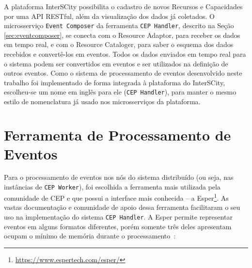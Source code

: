 A plataforma InterSCity possibilita o cadastro de novos Recursos e Capacidades por uma API RESTful, além da visualização dos dados já coletados. O microsserviço \texttt{Event Composer} da ferramenta \texttt{CEP Handler}, descrito na Seção \ref{sec:eventcomposer}, se conecta com o Resource Adaptor, para receber os dados em tempo real, e com o Resource Cataloger, para saber o esquema dos dados recebidos e convertê-los em eventos. Todos os dados enviados em tempo real para o sistema podem ser convertidos em eventos e ser utilizados na definição de outros eventos.
Como o sistema de processamento de eventos desenvolvido neste trabalho foi implementado de forma integrada à plataforma do InterSCity, escolheu-se um nome em inglês para ele (\texttt{CEP Handler}), para manter o mesmo estilo de nomenclatura já usado nos microsserviços da plataforma.  


\section{Ferramenta de Processamento de Eventos}
Para o processamento de eventos nos nós do sistema distribuído (ou seja, nas instâncias de \texttt{CEP Worker}), foi escolhida a ferramenta mais utilizada pela comunidade de CEP e que possui a interface mais conhecida -- a Esper\footnote{\url{https://www.espertech.com/esper/}}. As vastas documentação e comunidade de apoio dessa ferramenta facilitaram o seu uso na implementação do sistema \texttt{CEP Handler}. %
A Esper permite representar eventos em alguns formatos diferentes, porém somente três deles apresentam ocupam o mínimo de memória durante o processamento~\citep{EsperEventRepresentation}: %

